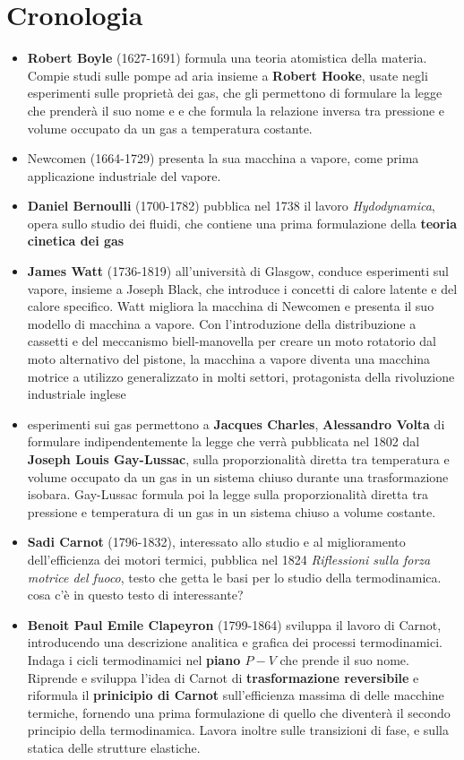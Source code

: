 \section*{Cronologia}
\begin{itemize}
    \item \textbf{Robert Boyle} (1627-1691) formula una teoria atomistica della materia. Compie studi sulle pompe ad aria insieme a \textbf{Robert Hooke}, usate negli esperimenti sulle proprietà dei gas, che gli permettono di formulare la legge che prenderà il suo nome e e che formula la relazione inversa tra pressione e volume occupato da un gas a temperatura costante.
    \item Newcomen (1664-1729) presenta la sua macchina a vapore, come prima applicazione industriale del vapore.
    \item \textbf{Daniel Bernoulli} (1700-1782) pubblica nel 1738 il lavoro \textit{Hydodynamica}, opera sullo studio dei fluidi, che contiene una prima formulazione della \textbf{teoria cinetica dei gas}
    \item \textbf{James Watt} (1736-1819) all'università di Glasgow, conduce esperimenti sul vapore, insieme a Joseph Black, che introduce i concetti di calore latente e del calore specifico. Watt migliora la macchina di Newcomen e presenta il suo modello di macchina a vapore. Con l'introduzione della distribuzione a cassetti e del meccanismo biell-manovella per creare un moto rotatorio dal moto alternativo del pistone, la macchina a vapore diventa una macchina motrice a utilizzo generalizzato in molti settori, protagonista della rivoluzione industriale inglese
    \item esperimenti sui gas permettono a \textbf{Jacques Charles}, \textbf{Alessandro Volta} di formulare indipendentemente la legge che verrà pubblicata nel 1802 dal \textbf{Joseph Louis Gay-Lussac}, sulla proporzionalità diretta tra temperatura e volume occupato da un gas in un sistema chiuso durante una trasformazione isobara. Gay-Lussac formula poi la legge sulla proporzionalità diretta tra pressione e temperatura di un gas in un sistema chiuso a volume costante.
    \item \textbf{Sadi Carnot} (1796-1832), interessato allo studio e al miglioramento dell'efficienza dei motori termici, pubblica nel 1824 \textit{Riflessioni sulla forza motrice del fuoco}, testo che getta le basi per lo studio della termodinamica. {\color{red} cosa c'è in questo testo di interessante?}
    \item \textbf{Benoit Paul Emile Clapeyron} (1799-1864) sviluppa il lavoro di Carnot, introducendo una descrizione analitica e grafica dei processi termodinamici. Indaga i cicli termodinamici nel \textbf{piano $P-V$} che prende il suo nome. Riprende e sviluppa l'idea di Carnot di \textbf{trasformazione reversibile} e riformula il \textbf{prinicipio di Carnot} sull'efficienza massima di delle macchine termiche, fornendo una prima formulazione di quello che diventerà il secondo principio della termodinamica. Lavora inoltre sulle transizioni di fase, e sulla statica delle strutture elastiche.

\end{itemize}

